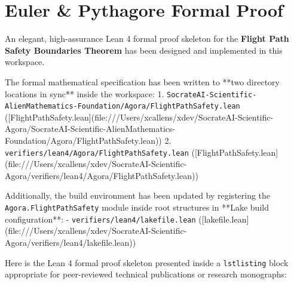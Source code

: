 \documentclass[11pt,a4paper]{book}
\begin{document}
\section*{Euler \& Pythagore Formal Proof}
An elegant, high-assurance Lean 4 formal proof skeleton for the \textbf{Flight Path Safety Boundaries Theorem} has been designed and implemented in this workspace.

The formal mathematical specification has been written to **two directory locations in sync** inside the workspace:
1. \texttt{SocrateAI-Scientific-AlienMathematics-Foundation/Agora/FlightPathSafety.lean} ([FlightPathSafety.lean](file:///Users/xcallens/xdev/SocrateAI-Scientific-Agora/SocrateAI-Scientific-AlienMathematics-Foundation/Agora/FlightPathSafety.lean))
2. \texttt{verifiers/lean4/Agora/FlightPathSafety.lean} ([FlightPathSafety.lean](file:///Users/xcallens/xdev/SocrateAI-Scientific-Agora/verifiers/lean4/Agora/FlightPathSafety.lean))

Additionally, the build environment has been updated by registering the \texttt{Agora.FlightPathSafety} module inside root structures in **Lake build configuration**:
- \texttt{verifiers/lean4/lakefile.lean} ([lakefile.lean](file:///Users/xcallens/xdev/SocrateAI-Scientific-Agora/verifiers/lean4/lakefile.lean))

Here is the Lean 4 formal proof skeleton presented inside a \texttt{lstlisting} block appropriate for peer-reviewed technical publications or research monographs:
\end{document}

